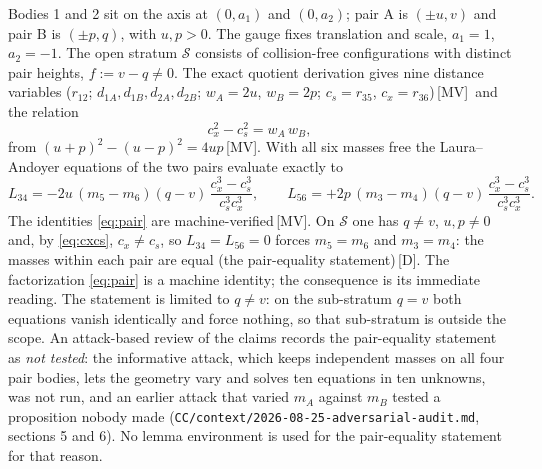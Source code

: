 \documentclass[11pt]{article}
\theoremstyle{definition}
\theoremstyle{remark}
\newcommand{\mk}[1]{\,{\scriptsize[#1]}}
\newcommand{\MV}{\mk{MV}}
\newcommand{\Dm}{\mk{D}}
\begin{document}
Bodies 1 and 2 sit on the axis at $(0,a_1)$ and $(0,a_2)$; pair A is $(\pm u,v)$ and pair B is
$(\pm p,q)$, with $u,p>0$. The gauge fixes translation and scale, $a_1=1$, $a_2=-1$. The open stratum
$\mathcal S$ consists of collision-free configurations with distinct pair heights, $f:=v-q\ne0$. The
exact quotient derivation gives nine distance variables
($r_{12}$; $d_{1A},d_{1B},d_{2A},d_{2B}$; $w_A=2u$, $w_B=2p$; $c_s=r_{35}$, $c_x=r_{36}$)\MV\ and the
relation
\begin{equation}\label{eq:cxcs}
c_x^2-c_s^2=w_A\,w_B ,
\end{equation}
from $(u+p)^2-(u-p)^2=4up$\MV. With all six masses free the Laura--Andoyer equations of the two pairs evaluate
exactly to
\begin{equation}\label{eq:pair}
L_{34}=-2u\,(m_5-m_6)(q-v)\,\frac{c_x^3-c_s^3}{c_s^3c_x^3},\qquad
L_{56}=+2p\,(m_3-m_4)(q-v)\,\frac{c_x^3-c_s^3}{c_s^3c_x^3} .
\end{equation}
The identities \eqref{eq:pair} are machine-verified\MV. On $\mathcal S$ one has $q\ne v$, $u,p\ne0$ and, by \eqref{eq:cxcs}, $c_x\ne c_s$, so $L_{34}=L_{56}=0$ forces
$m_5=m_6$ and $m_3=m_4$: the masses within each pair are equal (the pair-equality statement)\Dm. The
factorization \eqref{eq:pair} is a machine identity; the consequence is its immediate reading. The
statement is limited to $q\ne v$: on the sub-stratum $q=v$ both equations vanish identically and force
nothing, so that sub-stratum is outside the scope. An attack-based review of the claims records the
pair-equality statement as \emph{not tested}: the informative attack, which keeps independent masses on all
four pair bodies, lets the geometry vary and solves ten equations in ten unknowns, was not run, and
an earlier attack that varied $m_A$ against $m_B$ tested a proposition nobody made
(\texttt{CC/context/2026-08-25-adversarial-audit.md}, sections 5 and 6). %
No lemma environment is used for the pair-equality statement for that reason.
\end{document}
